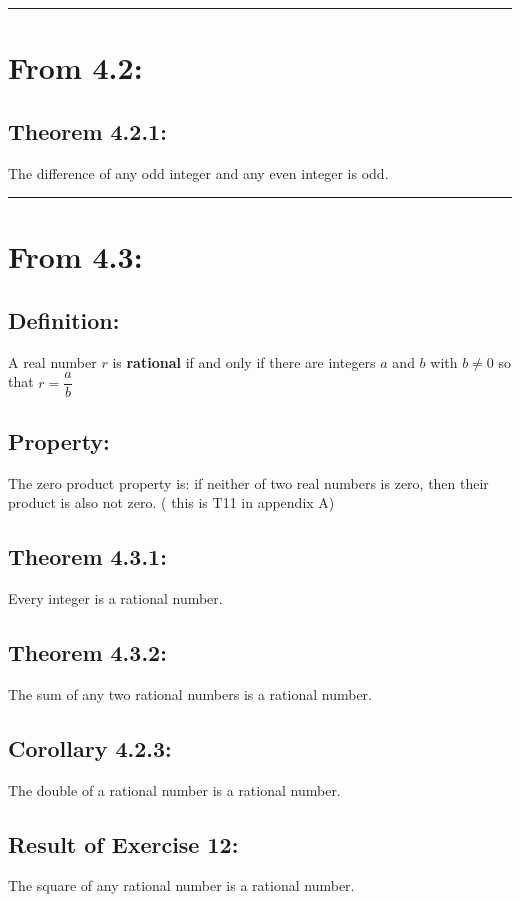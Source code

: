 \documentclass[11pt]{article}
\begin{document}
\bigskip
\hrule
\bigskip

\section*{From 4.2:}
\subsection*{Theorem 4.2.1:}
The difference of any odd integer and any even integer is odd. 

\bigskip
\hrule
\bigskip

\newpage
{}

\section*{From 4.3:}
\subsection*{Definition:}
A real number $r$ is {\bf rational} if and only if 
there are integers $a$ and $b$ with $b \neq 0$ so that
$r = \dfrac{a}{b}$

\subsection*{Property:}
The zero product property is: if neither of two 
real numbers is zero, then their product is also not zero. (
    this is T11 in appendix A)

\subsection*{Theorem 4.3.1:}
Every integer is a rational number.

\subsection*{Theorem 4.3.2:}
The sum of any two rational numbers is a rational number. 

\subsection*{Corollary 4.2.3:}
The double of a rational number is a rational number. 

\subsection*{Result of Exercise 12:}
The square of any rational number is a rational number. 
\end{document}
